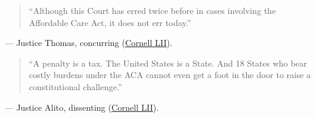\documentclass[12pt]{article}
\begin{document}
\begin{quote}
``Although this Court has erred twice before in cases involving the Affordable Care Act, it does not err today.''
\end{quote}
\noindent --- Justice Thomas, concurring (\href{https://www.law.cornell.edu/supremecourt/text/19-840}{Cornell LII}).

\begin{quote}
``A penalty is a tax. The United States is a State. And 18 States who bear costly burdens under the ACA cannot even get a foot in the door to raise a constitutional challenge.''
\end{quote}
\noindent --- Justice Alito, dissenting (\href{https://www.law.cornell.edu/supremecourt/text/19-840}{Cornell LII}).
\end{document}

